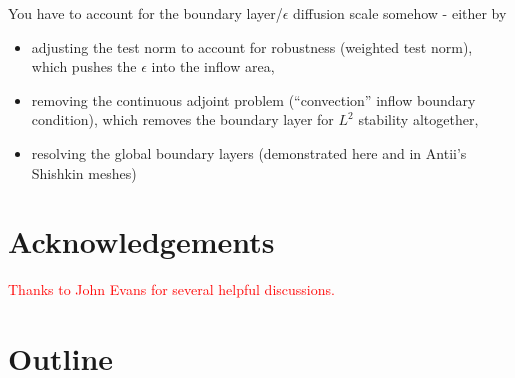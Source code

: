 \documentclass[11pt,onecolumn]{scrartcl}
\begin{document}
You have to account for the boundary layer/$\epsilon$ diffusion scale somehow - either by 
\begin{itemize}
\item adjusting the test norm to account for robustness (weighted test norm), which pushes the $\epsilon$ into the inflow area, 
\item removing the continuous adjoint problem (``convection'' inflow boundary condition), which removes the boundary layer for $L^2$ stability altogether, 
\item resolving the global boundary layers (demonstrated here and in Antii's Shishkin meshes)
\end{itemize}

\section{Acknowledgements}

\textcolor{red}{Thanks to John Evans for several helpful discussions.}




\section{Outline}
\end{document}

